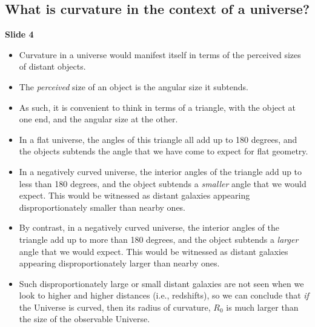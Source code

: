 \documentclass[11pt]{article}
\begin{document}
\subsection{What is curvature in the context of a universe?}
{\bf Slide 4}
\begin{itemize}
\item Curvature in a universe would manifest itself in terms of the perceived sizes of distant objects.
\item The {\it perceived} size of an object is the angular size it subtends.
\item As such, it is convenient to think in terms of a triangle, with the object at one end, and the angular size at the other.
\item In a flat universe, the angles of this triangle all add up to 180 degrees, and the objects subtends the angle that we have come to expect for flat geometry.
\item In a negatively curved universe, the interior angles of the triangle add up to less than 180 degrees, and the object subtends a {\it smaller} angle that we would expect. This would be witnessed as distant galaxies appearing disproportionately smaller than nearby ones.
\item By contrast, in a negatively curved universe, the interior angles of the triangle add up to more than 180 degrees, and the object subtends a {\it larger} angle that we would expect. This would be witnessed as distant galaxies appearing disproportionately larger than nearby ones.
\item Such disproportionately large or small distant galaxies are not seen when we look to higher and higher distances (i.e., redshifts), so we can conclude that {\it if} the Universe is curved, then its radius of curvature, $R_0$ is much larger than the size of the observable Universe.

\end{itemize}
\end{document}
